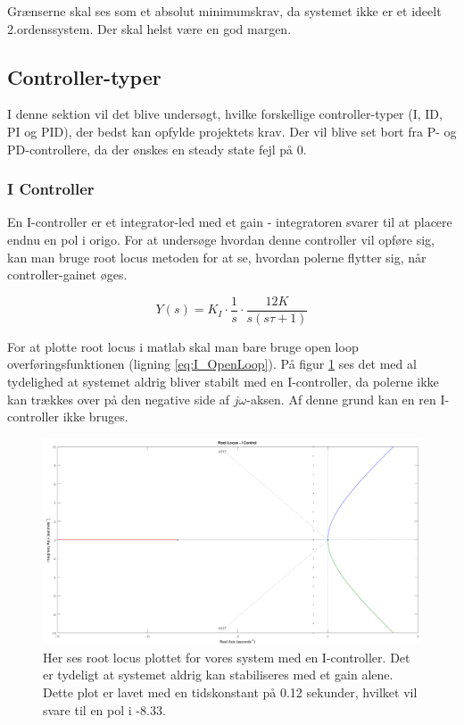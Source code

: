 Grænserne skal ses som et absolut minimumskrav, da systemet ikke er et ideelt 2.ordenssystem. Der skal helst være en god margen.

\subsection{Controller-typer}

I denne sektion vil det blive undersøgt, hvilke forskellige controller-typer (I, ID, PI og PID), der bedst kan opfylde projektets krav. Der vil blive set bort fra P- og PD-controllere, da der ønskes en steady state fejl på 0. 

\subsubsection{I Controller}

En I-controller er et integrator-led med et gain - integratoren svarer til at placere endnu en pol i origo. For at undersøge hvordan denne controller vil opføre sig, kan man bruge root locus metoden for at se, hvordan polerne flytter sig, når controller-gainet øges. 

\begin{equation}\label{eq:I_OpenLoop}
Y(s)=K_{I}\cdot\frac{1}{s}\cdot\frac{12K}{s(s\tau+1)}
\end{equation}

For at plotte root locus i matlab skal man bare bruge open loop overføringsfunktionen (ligning \ref{eq:I_OpenLoop}). På figur \ref{fig:I_rlocus} ses det med al tydelighed at systemet aldrig bliver stabilt med en I-controller, da polerne ikke kan trækkes over på den negative side af $j\omega$-aksen. Af denne grund kan en ren I-controller ikke bruges.

\begin{figure}[ht]
	\begin{center}
		\includegraphics[scale=0.35]{Billeder/I_rlocus.PNG}
	\end{center}
\caption{Her ses root locus plottet for vores system med en I-controller. Det er tydeligt at systemet aldrig kan stabiliseres med et gain alene. Dette plot er lavet med en tidskonstant på 0.12 sekunder, hvilket vil svare til en pol i -8.33.}
\label{fig:I_rlocus}
\end{figure}

